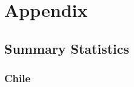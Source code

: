 \documentclass[11pt]{article}
\begin{document}
\pagebreak
\newpage












\pagebreak
\newpage

\section*{Appendix} \label{Appendix}
\subsection{Summary Statistics}

\subsubsection{Chile}
\end{document}

